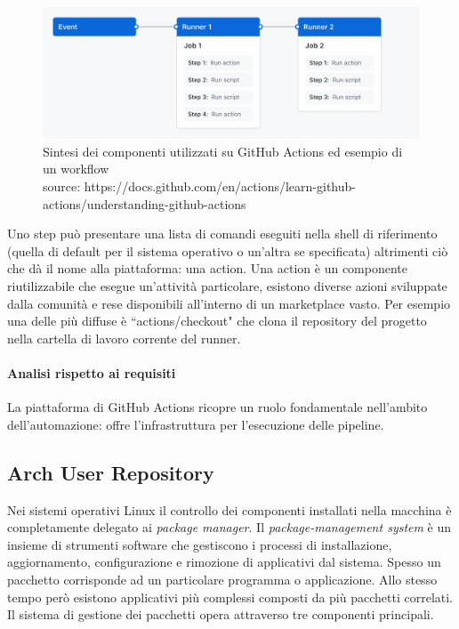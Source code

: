 \begin{figure}[H]
	\centering
	\includegraphics[width=.9\linewidth]{figures/overview-actions-simple.png}
	\caption{Sintesi dei componenti utilizzati su GitHub Actions ed esempio di un workflow \\ source: https://docs.github.com/en/actions/learn-github-actions/understanding-github-actions}
	\label{fig:github-actions-example}
\end{figure}

Uno step può presentare una lista di comandi eseguiti nella shell di riferimento (quella di default per il sistema operativo o un'altra se specificata) altrimenti ciò che dà il nome alla piattaforma: una action. Una action è un componente riutilizzabile che esegue un'attività particolare, esistono diverse azioni sviluppate dalla comunità e rese disponibili all'interno di un marketplace vasto. Per esempio una delle più diffuse è ``actions/checkout" che clona il repository del progetto nella cartella di lavoro corrente del runner.

\paragraph{Analisi rispetto ai requisiti}

La piattaforma di GitHub Actions ricopre un ruolo fondamentale nell'ambito dell'automazione: offre l'infrastruttura per l'esecuzione delle pipeline.

\subsection{Arch User Repository}

Nei sistemi operativi Linux il controllo dei componenti installati nella macchina è completamente delegato ai \textit{package manager}. Il \textit{package-management system} è un insieme di strumenti software che gestiscono i processi di installazione, aggiornamento, configurazione e rimozione di applicativi dal sistema. Spesso un pacchetto corrisponde ad un particolare programma o applicazione. Allo stesso tempo però esistono applicativi più complessi composti da più pacchetti correlati. Il sistema di gestione dei pacchetti opera attraverso tre componenti principali.


